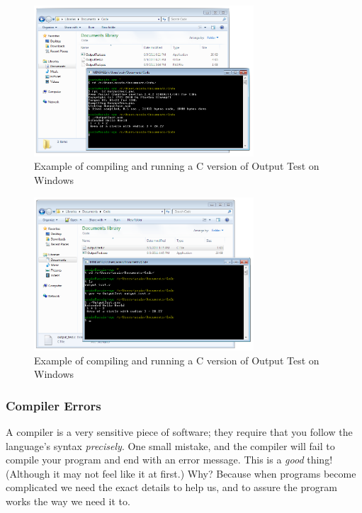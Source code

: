 \begin{figure}[h]
   \centering
   \includegraphics[width=0.73\textwidth]{./topics/program-creation/images/WindowsCompleteExample} 
   \caption{Example of compiling and running a C version of Output Test on Windows}
   \label{fig:program-creation-complete-windows-version}
\end{figure}

\begin{figure}[h]
   \centering
   \includegraphics[width=0.73\textwidth]{./topics/program-creation/images/WindowsCompleteExample1} 
   \caption{Example of compiling and running a C version of Output Test on Windows}
   \label{fig:program-creation-complete-windows-version-1}
\end{figure}

\clearpage
\subsubsection{Compiler Errors} %
\label{ssub:compiler_errors}

A compiler is a very sensitive piece of software; they require that you follow the language's syntax \emph{precisely}. One small mistake, and the compiler will fail to compile your program and end with an error message. This is a \emph{good} thing! (Although it may not feel like it at first.) Why? Because when programs become complicated we need the exact details to help us, and to assure the program works the way we need it to.

